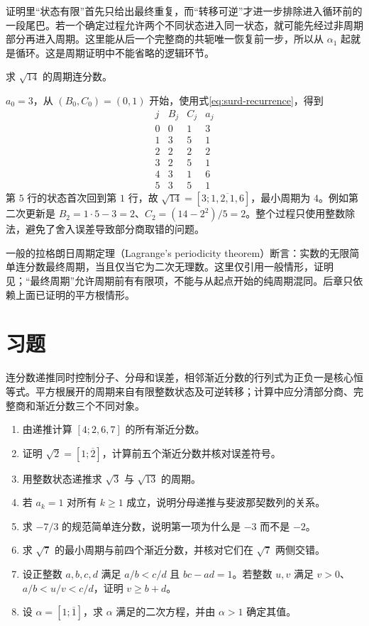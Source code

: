 证明里“状态有限”首先只给出最终重复，而“转移可逆”才进一步排除进入循环前的一段尾巴。若一个确定过程允许两个不同状态进入同一状态，就可能先经过非周期部分再进入周期。这里能从后一个完整商的共轭唯一恢复前一步，所以从 $\alpha_1$ 起就是循环。这是周期证明中不能省略的逻辑环节。

\begin{example}[平方根展开的整数计算表]
求 $\sqrt{14}$ 的周期连分数。
\end{example}
\begin{solve}
$a_0=3$，从 $(B_0,C_0)=(0,1)$ 开始，使用式\eqref{eq:surd-recurrence}，得到
\[
\begin{array}{c|r|r|r}
j&B_j&C_j&a_j\\\hline
0&0&1&3\\
1&3&5&1\\
2&2&2&2\\
3&2&5&1\\
4&3&1&6\\
5&3&5&1
\end{array}
\]
第 $5$ 行的状态首次回到第 $1$ 行，故 $\sqrt{14}=[3;\overline{1,2,1,6}]$，最小周期为 $4$。例如第二次更新是 $B_2=1\cdot5-3=2$、$C_2=(14-2^2)/5=2$。整个过程只使用整数除法，避免了舍入误差导致部分商取错的问题。
\end{solve}

一般的拉格朗日周期定理（Lagrange's periodicity theorem）断言：实数的无限简单连分数最终周期，当且仅当它为二次无理数。这里仅引用一般情形，证明见\cite{mit-periodic}；“最终周期”允许周期前有有限项，不能与从起点开始的纯周期混同。后章只依赖上面已证明的平方根情形。

\section{习题}

连分数递推同时控制分子、分母和误差，相邻渐近分数的行列式为正负一是核心恒等式。平方根展开的周期来自有限整数状态及可逆转移；计算中应分清部分商、完整商和渐近分数三个不同对象。

\begin{enumerate}
 \item 由递推计算 $[4;2,6,7]$ 的所有渐近分数。
 \item 证明 $\sqrt2=[1;\overline2]$，计算前五个渐近分数并核对误差符号。
 \item 用整数状态递推求 $\sqrt3$ 与 $\sqrt{13}$ 的周期。
 \item 若 $a_k=1$ 对所有 $k\ge1$ 成立，说明分母递推与斐波那契数列的关系。
 \item\label{ex:cf-negative} 求 $-7/3$ 的规范简单连分数，说明第一项为什么是 $-3$ 而不是 $-2$。
 \item\label{ex:cf-sqrt-seven} 求 $\sqrt7$ 的最小周期与前四个渐近分数，并核对它们在 $\sqrt7$ 两侧交错。
 \item\label{ex:cf-neighbors} 设正整数 $a,b,c,d$ 满足 $a/b<c/d$ 且 $bc-ad=1$。若整数 $u,v$ 满足 $v>0$、$a/b<u/v<c/d$，证明 $v\ge b+d$。
 \item\label{ex:cf-golden} 设 $\alpha=[1;\overline1]$，求 $\alpha$ 满足的二次方程，并由 $\alpha>1$ 确定其值。
\end{enumerate}

